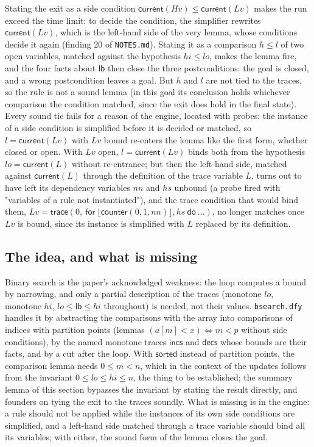 \documentclass[11pt,a4paper]{article}
\newcommand{\bl}[1]{\lfloor #1\rfloor}                       %
\newcommand{\tr}[3]{\mathsf{trace}(#1,\ \mathsf{for}\ #2\ \mathsf{do}\ #3)}
\newcommand{\cnt}{\mathsf{counter}}
\newcommand{\cur}{\mathsf{current}}
\newcommand{\sorted}{\mathsf{sorted}}
\begin{document}
Stating the exit as a side condition $\cur(Hv) \le \cur(Lv)$ makes the run exceed the time limit: to decide
the condition, the simplifier rewrites $\cur(Lv)$, which is the left-hand side of the very lemma, whose
conditions decide it again (finding 20 of \texttt{NOTES.md}). Stating it as a comparison $h \le l$ of two
open variables, matched against the hypothesis $hi \le lo$, makes the lemma fire, and the four facts about
$\mathsf{lb}$ then close the three postconditions: the goal is closed, and a wrong postcondition leaves a
goal. But $h$ and $l$ are not tied to the traces, so the rule is not a sound lemma (in this goal its
conclusion holds whichever comparison the condition matched, since the exit does hold in the final state).
Every sound tie fails for a reason of the engine, located with probes: the instance of a side condition is
simplified before it is decided or matched, so $l = \cur(Lv)$ with $Lv$ bound re-enters the lemma like the
first form, whether closed or open. With $Lv$ open, $l = \cur(Lv)$ binds both from the hypothesis $lo = \cur(L)$
without re-entrance; but then the left-hand side, matched against $\cur(L)$ through the definition of the
trace variable $L$, turns out to have left its dependency variables $nn$ and $hs$ unbound (a probe fired with
"variables of a rule not instantiated"), and the trace condition that would bind them,
$Lv = \tr{0}{\bl{\cnt(0, 1, nn)}, hs}{\ldots}$, no longer matches once $Lv$ is bound, since its instance is
simplified with $L$ replaced by its definition.

\subsection{The idea, and what is missing}
Binary search is the paper's acknowledged weakness: the loop computes a bound by narrowing, and only a
partial description of the traces (monotone $lo$, monotone $hi$, $lo \le \mathsf{lb} \le hi$ throughout) is
needed, not their values. \texttt{bsearch.dfy} handles it by abstracting the comparisons with the array
into comparisons of indices with partition points (lemmas $(a[m] < x) \Leftrightarrow m < p$ without side
conditions), by the named monotone traces $\mathsf{incs}$ and $\mathsf{decs}$ whose bounds are their
facts, and by a cut after the loop. With $\sorted$ instead of partition points, the comparison lemma needs
$0 \le m < n$, which in the context of the updates follows from the invariant $0 \le lo \le hi \le n$,
the thing to be established; the summary lemma of this section bypasses the invariant by stating the
result directly, and founders on tying the exit to the traces soundly. What is missing is in the engine: a
rule should not be applied while the instances of its own side conditions are simplified, and a left-hand
side matched through a trace variable should bind all its variables; with either, the sound form of the
lemma closes the goal.
\end{document}
